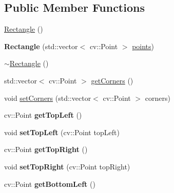 \subsection*{Public Member Functions}
\begin{DoxyCompactItemize}
\item 
\mbox{\hyperlink{class_geometry2_d_1_1_rectangle_a2a2140f72054ed537c35bcd90bcdd593}{Rectangle}} ()
\item 
\mbox{\label{class_geometry2_d_1_1_rectangle_a317593dc0f052818e86495ef1ec3b30e}} 
{\bfseries Rectangle} (std\+::vector$<$ cv\+::\+Point $>$ \mbox{\hyperlink{class_geometry2_d_1_1_polygon_ab965e028324c2199022da00ff7eef14b}{points}})
\item 
\mbox{\hyperlink{class_geometry2_d_1_1_rectangle_a8fbc2f925d0b9e501cce72ec5282518a}{$\sim$\+Rectangle}} ()
\item 
std\+::vector$<$ cv\+::\+Point $>$ \mbox{\hyperlink{class_geometry2_d_1_1_rectangle_abe1ebd4b4d74c433120fdf9626a8dd65}{get\+Corners}} ()
\item 
void \mbox{\hyperlink{class_geometry2_d_1_1_rectangle_a5fc314db2e50e7b7b9360900d37ad212}{set\+Corners}} (std\+::vector$<$ cv\+::\+Point $>$ corners)
\item 
\mbox{\label{class_geometry2_d_1_1_rectangle_a80d298e1dd64b46a6361f0f3d45fe0f7}} 
cv\+::\+Point {\bfseries get\+Top\+Left} ()
\item 
\mbox{\label{class_geometry2_d_1_1_rectangle_ac145e03588d1f1eb371f8547f7a6bd2d}} 
void {\bfseries set\+Top\+Left} (cv\+::\+Point top\+Left)
\item 
\mbox{\label{class_geometry2_d_1_1_rectangle_af5b3d717ab45f875c7c36caa2dd38be7}} 
cv\+::\+Point {\bfseries get\+Top\+Right} ()
\item 
\mbox{\label{class_geometry2_d_1_1_rectangle_a00005d17343775c529a8cbacd0956bdb}} 
void {\bfseries set\+Top\+Right} (cv\+::\+Point top\+Right)
\item 
\mbox{\label{class_geometry2_d_1_1_rectangle_ae07e78781178d09dd568e403e59517be}} 
cv\+::\+Point {\bfseries get\+Bottom\+Left} ()
\item 

\end{DoxyCompactItemize}
